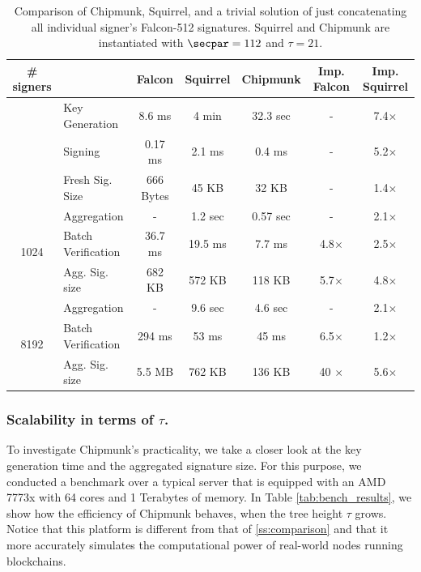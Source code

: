 \begin{table}\centering
  \begin{tabular}{clccccc}
    \# signers      &                 & Falcon      & Squirrel  & Chipmunk  & Imp. Falcon & Imp. Squirrel \\\toprule
    \multirow{2}{*}{} 
                    & Key Generation  & 8.6 ms      & 4 min     & 32.3 sec  &     -       & 7.4$\times$ \\%
                    & Signing         & 0.17 ms     & 2.1 ms    & 0.4 ms    &     -       & 5.2$\times$ \\%
                    &Fresh Sig. Size  & 666 Bytes   & 45 KB     & 32 KB     &     -       & 1.4$\times$ \\\midrule
    \multirow{3}{*}{1024}                
                    &Aggregation      & -           & 1.2 sec   & 0.57 sec  &     -       & 2.1$\times$ \\%
                    &Batch Verification    
                                      & 36.7 ms     & 19.5 ms   & 7.7 ms    & 4.8$\times$ & 2.5$\times$ \\%
                    
                    &Agg. Sig. size   & 682 KB      & 572 KB    & 118 KB    & 5.7$\times$ & 4.8$\times$ \\\midrule
    \multirow{3}{*}{8192}                
                    &Aggregation      & -           & 9.6 sec   & 4.6 sec   &     -       & 2.1$\times$ \\%
                    &Batch Verification    
                                      & 294 ms      & 53  ms    &  45 ms    & 6.5$\times$ & 1.2$\times$ \\%
                    &Agg. Sig. size   & 5.5 MB      & 762 KB    & 136 KB    & 40 $\times$ & 5.6$\times$\\ \bottomrule
  \end{tabular}
  \caption{Comparison of Chipmunk, Squirrel, and a trivial solution of just concatenating all individual signer's Falcon-512 signatures. Squirrel and Chipmunk are instantiated with $\secpar = 112$ and $\tau=21$. %
  }\label{tab:benchmarksizes}
\end{table}

\subsubsection{Scalability in terms of $\tau$.}
To investigate Chipmunk's practicality, we take a closer look at the key generation time and the aggregated signature size.
For this purpose, we conducted a benchmark over a typical server that is equipped with an AMD 7773x with 64 cores and 1 Terabytes of memory.
In Table \ref{tab:bench_results}, we show how the efficiency of Chipmunk behaves, when the tree height $\tau$ grows.
Notice that this platform is different from that of \autoref{ss:comparison} and that it more accurately simulates the computational power of real-world nodes running blockchains.

